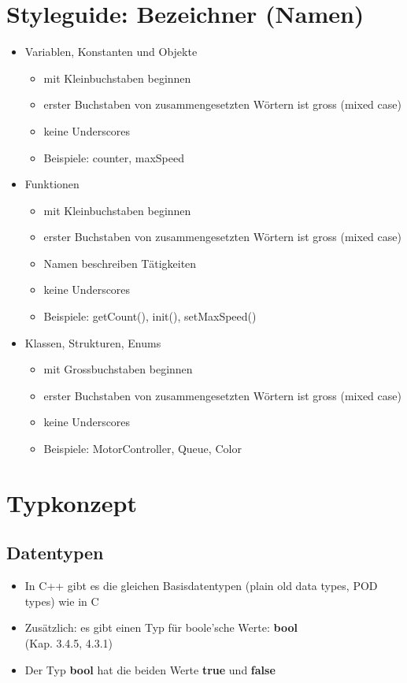 \section{Styleguide: Bezeichner (\raisebox{-0.9ex}{\~{ }}Namen)}
\label{sec:Styleguide: Bezeichner}
\begin{itemize}
	\item Variablen, Konstanten und Objekte
	\begin{itemize}
		\item mit Kleinbuchstaben beginnen
		\item erster Buchstaben von zusammengesetzten Wörtern ist gross (mixed case)
		\item keine Underscores
		\\
		\item[\-] Beispiele: counter, maxSpeed
		\\
	\end{itemize}
	\item Funktionen
	\begin{itemize}
		\item mit Kleinbuchstaben beginnen
		\item erster Buchstaben von zusammengesetzten Wörtern ist gross (mixed case)
		\item Namen beschreiben Tätigkeiten
		\item keine Underscores
		\\
		\item[\-] Beispiele: getCount(), init(), setMaxSpeed()
		\\
	\end{itemize}
	\item Klassen, Strukturen, Enums
	\begin{itemize}
		\item mit Grossbuchstaben beginnen
		\item erster Buchstaben von zusammengesetzten Wörtern ist gross (mixed case)
		\item keine Underscores
		\\
		\item[\-] Beispiele: MotorController, Queue, Color
	\end{itemize}
\end{itemize}

\section{Typkonzept}
\label{sec:Typkonzept}

\subsection{Datentypen}
\label{sec:Datentypen}
\begin{itemize}
	\item In C++ gibt es die gleichen Basisdatentypen (plain old data types, POD types) wie in C
	\item Zusätzlich: es gibt einen Typ für boole'sche Werte: \textbf{bool}
		\\ \small{(Kap. 3.4.5, 4.3.1)}
	\item Der Typ \textbf{bool} hat die beiden Werte \textbf{true} und \textbf{false}
\end{itemize}

